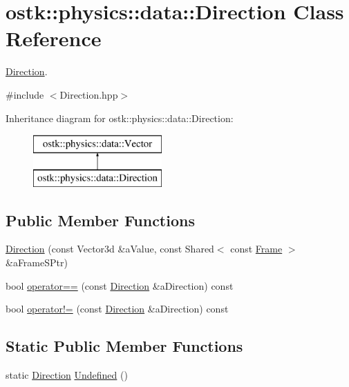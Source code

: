 \hypertarget{classostk_1_1physics_1_1data_1_1_direction}{}\section{ostk\+:\+:physics\+:\+:data\+:\+:Direction Class Reference}
\label{classostk_1_1physics_1_1data_1_1_direction}


\hyperlink{classostk_1_1physics_1_1data_1_1_direction}{Direction}.  




{\ttfamily \#include $<$Direction.\+hpp$>$}

Inheritance diagram for ostk\+:\+:physics\+:\+:data\+:\+:Direction\+:\begin{figure}[H]
\begin{center}
\leavevmode
\includegraphics[height=2.000000cm]{classostk_1_1physics_1_1data_1_1_direction}
\end{center}
\end{figure}
\subsection*{Public Member Functions}
\begin{DoxyCompactItemize}
\item 
\hyperlink{classostk_1_1physics_1_1data_1_1_direction_ac247d7c6d290db488940c0100b5cda5d}{Direction} (const Vector3d \&a\+Value, const Shared$<$ const \hyperlink{classostk_1_1physics_1_1coord_1_1_frame}{Frame} $>$ \&a\+Frame\+S\+Ptr)
\item 
bool \hyperlink{classostk_1_1physics_1_1data_1_1_direction_aa1d684ca3528113e412f9d8b5d51b49f}{operator==} (const \hyperlink{classostk_1_1physics_1_1data_1_1_direction}{Direction} \&a\+Direction) const
\item 
bool \hyperlink{classostk_1_1physics_1_1data_1_1_direction_a90bf1d390562e9b3a8115af07b6b4e6b}{operator!=} (const \hyperlink{classostk_1_1physics_1_1data_1_1_direction}{Direction} \&a\+Direction) const
\end{DoxyCompactItemize}
\subsection*{Static Public Member Functions}
\begin{DoxyCompactItemize}
\item 
static \hyperlink{classostk_1_1physics_1_1data_1_1_direction}{Direction} \hyperlink{classostk_1_1physics_1_1data_1_1_direction_a47b0ba9fb3f592e2fd1fba846af6483c}{Undefined} ()
\end{DoxyCompactItemize}

